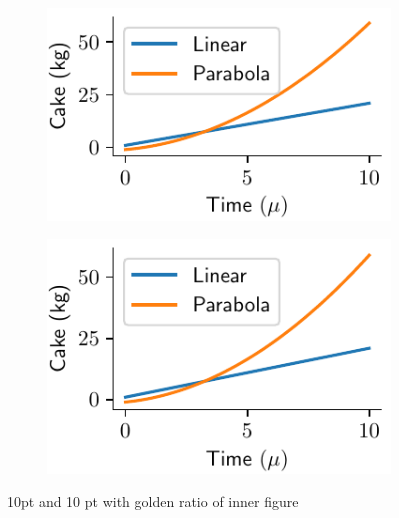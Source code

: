 \documentclass[a4paper,11pt]{report} %
\numberwithin{equation}{section}
\begin{document}
\begin{figure}
	\centering
	\begin{subfigure}{0.49\textwidth}
		\centering
		\includegraphics[width=1\linewidth]{fig/TwoGolden11.pdf}
		\caption{}
	\end{subfigure}
	\begin{subfigure}{0.49\textwidth}
		\centering
		\includegraphics[width=1\linewidth]{fig/TwoInnerGolden11.pdf}
		\caption{}
	\end{subfigure}
	\caption{10pt and 10 pt with golden ratio of inner figure}
\end{figure}
\end{document}
